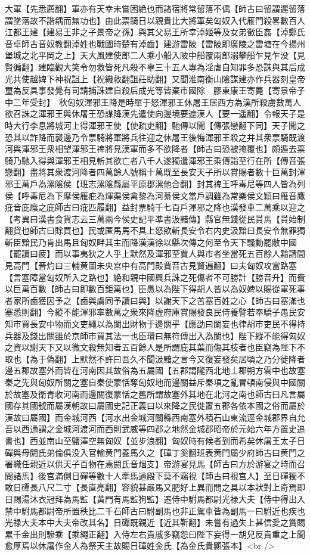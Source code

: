大軍【先悉薦翻】軍亦有天幸未嘗困絶也而諸宿將常留落不偶【師古曰留謂遲留落謂墜落故不諧耦而無功也】由此票騎日以親貴比大將軍矣匈奴入代雁門殺畧數百人　江都王建【建易王非之子景帝之孫】與其父易王所幸淖姬等及女弟徵臣姦【淖鄭氏音卓師古音奴教翻淖姓也戰國時楚有淖齒】建游雷陂【雷陂即廣陵之雷塘在今揚州堡城之北平岡之上】天大風建使郎二人乘小船入陂中船覆兩郎溺攀船乍見乍没【見賢徧翻】建臨觀大笑令勿救皆死凡殺不辜三十五人專為淫虐自知罪多恐誅與其后成光共使越婢下神祝詛上【祝織救翻詛莊助翻】又聞淮南衡山隂謀建亦作兵器刻皇帝璽為反具事發覺有司請捕誅建自殺后成光等皆棄市國除　膠東康王寄薨【寄景帝子中二年受封】　秋匈奴渾邪王降是時單于怒渾邪王休屠王居西方為漢所殺虜數萬人欲召誅之渾邪王與休屠王恐謀降漢先遣使向邊境要遮漢人【要一遥翻】令報天子是時大行李息將城河上得渾邪王使【使疏吏翻】馳傳以聞【傳張戀翻下同】天子聞之恐其以詐降而襲邊乃令票騎將軍將兵往迎之休屠王後悔渾邪王殺之并其衆票騎既渡河與渾邪王衆相望渾邪王禆將見漢軍而多不欲降者【師古曰恐被掩覆也】頗遁去票騎乃馳入得與渾邪王相見斬其欲亡者八千人遂獨遣渾邪王乘傳詣至行在所【傳音張戀翻】盡將其衆渡河降者四萬餘人號稱十萬既至長安天子所以賞賜者數十巨萬封渾邪王萬戶為漯隂侯【班志漯隂縣屬平原郡漯他合翻】封其禆王呼毒尼等四人皆為列侯【呼毒尼為下摩侯雁疪為煇渠侯禽黎為河綦侯文當戶調雖為常樂侯文穎曰雁音鷹疪音庇廕之庇師古曰疪匹履翻】益封票騎千七百戶渾邪之降也漢發車二萬乘以迎之【考異曰漢書食貨志云三萬兩今侯史記平凖書汲黯傳】縣官無錢從民貰馬【貰始制翻貸也師古曰賖買也】民或匿馬馬不具上怒欲斬長安令右内史汲黯曰長安令無罪獨斬臣黯民乃肯出馬且匈奴畔其主而降漢漢徐以縣次傳之何至令天下騷動罷敝中國【罷讀曰疲】而以事夷狄之人乎上默然及渾邪至賈人與市者坐當死五百餘人黯請間見高門【晉灼曰三輔黄圖未央宫中有高門殿賈音古見賢遍翻】曰夫匈奴攻當路塞【言塞障當匈奴所入之路也】絶和親中國興兵誅之死傷者不可勝計【勝音升】而費以巨萬百數【師古曰即數百鉅萬也】臣愚以為陛下得胡人皆以為奴婢以賜從軍死事者家所鹵獲因予之【鹵與虜同予讀曰與】以謝天下之苦塞百姓之心【師古曰塞滿也塞悉則翻】今縱不能渾邪率數萬之衆來降虚府庫賞賜發良民侍養譬若奉驕子愚民安知市買長安中物而文吏繩以為闌出財物于邊關乎【應劭曰闌妄也律胡市吏民不得持兵器及錢出關雖於京師市買其法一也臣瓚曰無符傳出入為闌也】陛下縱不能得匈奴之資以謝天下又以微文殺無知者五百餘人是所謂庇其葉而傷其枝者也臣竊為陛下不取也【為于偽翻】上默然不許曰吾久不聞汲黯之言今又復妄發矣居頃之乃分徙降者邊五郡故塞外而皆在河南因其故俗為五屬國【五郡謂隴西北地丄郡朔方雲中也故塞秦之先與匈奴所關之塞自秦使蒙恬奪匈奴地而邊關益斥秦項之亂冒頓南侵與中國關於故塞及衛青收河南而邊關復蒙恬之舊所謂故塞外其地在北河之南也師古曰凡言屬國存其國號而屬漢朝故曰屬國史記正義曰以來降之民徙置五郡各依本國之俗而屬於漢故曰屬國】而金城河西【河水出金城河關縣西南塞外積石山東流逕金城郡界自允吾以西通謂之金城河渡河而西則武威等四郡之地然金城郡昭帝於元始六年方置史追書也】西並南山至鹽澤空無匈奴【並步浪翻】匈奴時有候者到而希矣休屠王太子日磾與母閼氏弟倫俱没入官輸黄門養馬久之【磾丁奚翻班表黄門屬少府師古曰黄門之署職任親近以供天子百物在焉閼氏音烟支】帝游宴見馬【師古曰方於游宴之時而召閲諸馬】後宫滿側日磾等數十人牽馬過殿下莫不竊視【師古曰視宫人】至日磾獨不敢日磾長八尺二寸【長直亮翻】容貌甚嚴馬又肥好上異而問之具以本狀對上奇焉即日賜湯沐衣冠拜為馬監【黄門有馬監狗監】遷侍中駙馬都尉光禄大夫【侍中得出入禁中駙馬都尉帝所置秩比二千石師古曰駙副馬也非正駕車皆為副馬一曰駙近也疾也光禄大夫本中大夫帝改其名】日磾既親近【近其靳翻】未嘗有過失上甚信愛之賞賜累千金出則驂乘【乘繩正翻】入侍左右貴戚多竊怨曰陛下妄得一胡兒反貴重之上聞愈厚焉以休屠作金人為祭天主故賜日磾姓金氏【為金氏貴顯張本】<br />
